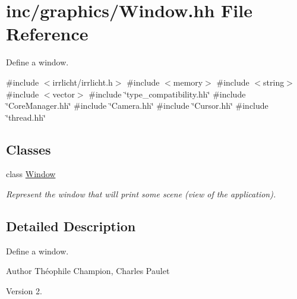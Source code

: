 \hypertarget{Window_8hh}{}\section{inc/graphics/\+Window.hh File Reference}
\label{Window_8hh}


Define a window.  


{\ttfamily \#include $<$irrlicht/irrlicht.\+h$>$}\newline
{\ttfamily \#include $<$memory$>$}\newline
{\ttfamily \#include $<$string$>$}\newline
{\ttfamily \#include $<$vector$>$}\newline
{\ttfamily \#include \char`\"{}type\+\_\+compatibility.\+hh\char`\"{}}\newline
{\ttfamily \#include \char`\"{}Core\+Manager.\+hh\char`\"{}}\newline
{\ttfamily \#include \char`\"{}Camera.\+hh\char`\"{}}\newline
{\ttfamily \#include \char`\"{}Cursor.\+hh\char`\"{}}\newline
{\ttfamily \#include \char`\"{}thread.\+hh\char`\"{}}\newline
\subsection*{Classes}
\begin{DoxyCompactItemize}
\item 
class \hyperlink{classWindow}{Window}
\begin{DoxyCompactList}\small\item\em Represent the window that will print some scene (view of the application). \end{DoxyCompactList}\end{DoxyCompactItemize}


\subsection{Detailed Description}
Define a window. 

\begin{DoxyAuthor}{Author}
Théophile Champion, Charles Paulet 
\end{DoxyAuthor}
\begin{DoxyVersion}{Version}
2. 
\end{DoxyVersion}
